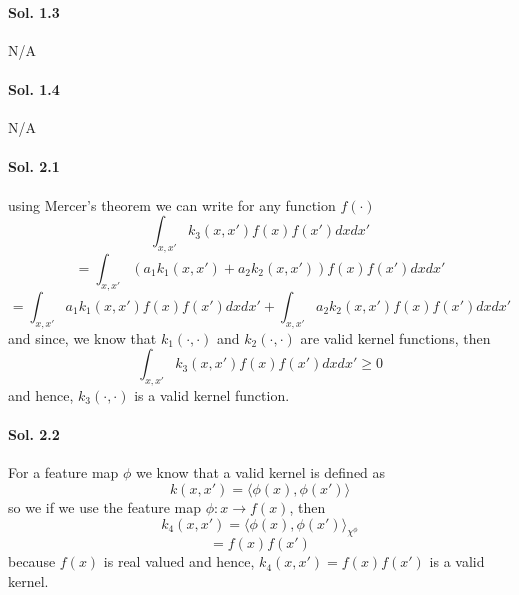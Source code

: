 \documentclass[]{report}
\begin{document}
\paragraph{Sol. 1.3}
	
	N/A

\paragraph{Sol. 1.4}
	
	N/A


\paragraph{Sol. 2.1}
	using Mercer's theorem we can write for any function $f(\cdot)$
	\[ \int_{x, x'} k_3 (x, x') f(x) f(x') dx dx' \]
	\[ = \int_{x, x'} (a_1 k_1 (x, x') + a_2 k_2 (x, x') ) f(x) f(x') dx dx' \]
	\[ = \int_{x, x'} a_1 k_1 (x, x') f(x) f(x') dx dx' + \int_{x, x'} a_2 k_2 (x, x') f(x) f(x') dx dx' \]
	and since, we know that $k_1 (\cdot, \cdot)$ and $k_2 (\cdot, \cdot)$ are valid kernel functions, then 
	\[ \int_{x, x'} k_3 (x, x') f(x) f(x') dx dx' \geq 0 \]
	and hence, $k_3 (\cdot, \cdot)$ is a valid kernel function.

\paragraph{Sol. 2.2}
	
	For a feature map $\phi$ we know that a valid kernel is defined as
	\[ k(x, x') = \langle \phi(x), \phi(x') \rangle \]
	so we if we use the feature map $\phi: x \rightarrow f(x)$, then 
	\[ k_4(x, x')  = {\langle \phi(x), \phi(x') \rangle}_{\chi^\phi} \]
	\[ = f(x) f(x') \]
	because $f(x)$ is real valued and hence, $k_4(x, x') = f(x) f(x')$ is a valid kernel.

\end{document}
